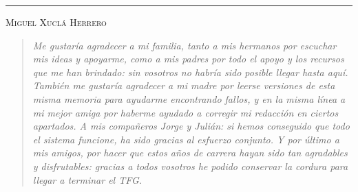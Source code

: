 \medskip
\noindent\rule{\textwidth}{0.2pt}
\medskip

\noindent\textsc{Miguel Xuclá Herrero} \hfill \\[0.3em]
\begin{quotation}
\noindent\itshape
Me gustaría agradecer a mi familia, tanto a mis hermanos por escuchar mis ideas y apoyarme, como a mis padres por todo el apoyo y los recursos que me han brindado: sin vosotros no habría sido posible llegar hasta aquí. También me gustaría agradecer a mi madre por leerse versiones de esta misma memoria para ayudarme encontrando fallos, y en la misma línea a mi mejor amiga por haberme ayudado a corregir mi redacción en ciertos apartados. A mis compañeros Jorge y Julián: si hemos conseguido que todo el sistema funcione, ha sido gracias al esfuerzo conjunto. Y por último a mis amigos, por hacer que estos años de carrera hayan sido tan agradables y disfrutables: gracias a todos vosotros he podido conservar la cordura para llegar a terminar el TFG.
\end{quotation}
